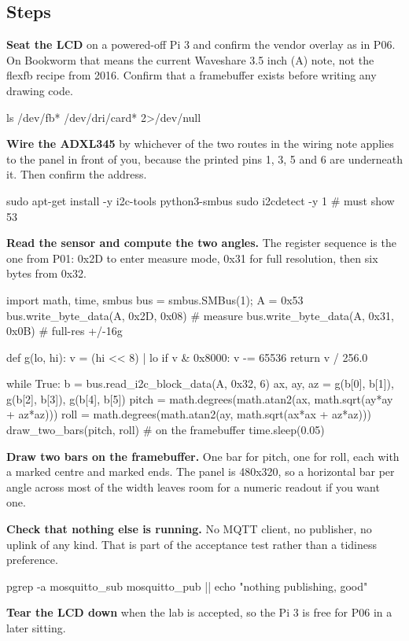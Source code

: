 \subsection*{Steps}

\begin{steps}
\item \textbf{Seat the LCD} on a powered-off Pi 3 and confirm the vendor overlay as in P06. On Bookworm that means the current Waveshare 3.5 inch (A) note, not the flexfb recipe from 2016. Confirm that a framebuffer exists before writing any drawing code.
\begin{shellcode}
ls /dev/fb* /dev/dri/card* 2>/dev/null
\end{shellcode}

\item \textbf{Wire the ADXL345} by whichever of the two routes in the wiring note applies to the panel in front of you, because the printed pins 1, 3, 5 and 6 are underneath it. Then confirm the address.
\begin{shellcode}
sudo apt-get install -y i2c-tools python3-smbus
sudo i2cdetect -y 1          # must show 53
\end{shellcode}

\item \textbf{Read the sensor and compute the two angles.} The register sequence is the one from P01: 0x2D to enter measure mode, 0x31 for full resolution, then six bytes from 0x32.
\begin{pycode}
import math, time, smbus
bus = smbus.SMBus(1); A = 0x53
bus.write_byte_data(A, 0x2D, 0x08)   # measure
bus.write_byte_data(A, 0x31, 0x0B)   # full-res +/-16g

def g(lo, hi):
    v = (hi << 8) | lo
    if v & 0x8000:
        v -= 65536
    return v / 256.0

while True:
    b = bus.read_i2c_block_data(A, 0x32, 6)
    ax, ay, az = g(b[0], b[1]), g(b[2], b[3]), g(b[4], b[5])
    pitch = math.degrees(math.atan2(ax, math.sqrt(ay*ay + az*az)))
    roll  = math.degrees(math.atan2(ay, math.sqrt(ax*ax + az*az)))
    draw_two_bars(pitch, roll)       # on the framebuffer
    time.sleep(0.05)
\end{pycode}

\item \textbf{Draw two bars on the framebuffer.} One bar for pitch, one for roll, each with a marked centre and marked ends. The panel is 480x320, so a horizontal bar per angle across most of the width leaves room for a numeric readout if you want one.

\item \textbf{Check that nothing else is running.} No MQTT client, no publisher, no uplink of any kind. That is part of the acceptance test rather than a tidiness preference.
\begin{shellcode}
pgrep -a mosquitto_sub mosquitto_pub || echo "nothing publishing, good"
\end{shellcode}

\item \textbf{Tear the LCD down} when the lab is accepted, so the Pi 3 is free for P06 in a later sitting.
\end{steps}

